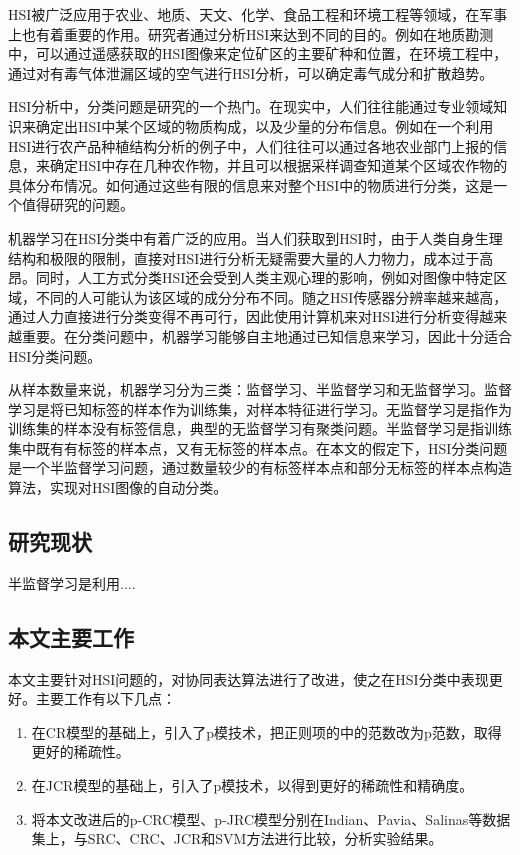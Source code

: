 \documentclass[12pt,a4paper]{article}
\begin{document}
HSI被广泛应用于农业、地质、天文、化学、食品工程和环境工程等领域，在军事上也有着重要的作用。研究者通过分析HSI来达到不同的目的。例如在地质勘测中，可以通过遥感获取的HSI图像来定位矿区的主要矿种和位置，在环境工程中，通过对有毒气体泄漏区域的空气进行HSI分析，可以确定毒气成分和扩散趋势。

HSI分析中，分类问题是研究的一个热门。在现实中，人们往往能通过专业领域知识来确定出HSI中某个区域的物质构成，以及少量的分布信息。例如在一个利用HSI进行农产品种植结构分析的例子中，人们往往可以通过各地农业部门上报的信息，来确定HSI中存在几种农作物，并且可以根据采样调查知道某个区域农作物的具体分布情况。如何通过这些有限的信息来对整个HSI中的物质进行分类，这是一个值得研究的问题。

机器学习在HSI分类中有着广泛的应用。当人们获取到HSI时，由于人类自身生理结构和极限的限制，直接对HSI进行分析无疑需要大量的人力物力，成本过于高昂。同时，人工方式分类HSI还会受到人类主观心理的影响，例如对图像中特定区域，不同的人可能认为该区域的成分分布不同。随之HSI传感器分辨率越来越高，通过人力直接进行分类变得不再可行，因此使用计算机来对HSI进行分析变得越来越重要。在分类问题中，机器学习能够自主地通过已知信息来学习，因此十分适合HSI分类问题。

从样本数量来说，机器学习分为三类：监督学习、半监督学习和无监督学习。监督学习是将已知标签的样本作为训练集，对样本特征进行学习。无监督学习是指作为训练集的样本没有标签信息，典型的无监督学习有聚类问题。半监督学习是指训练集中既有有标签的样本点，又有无标签的样本点。在本文的假定下，HSI分类问题是一个半监督学习问题，通过数量较少的有标签样本点和部分无标签的样本点构造算法，实现对HSI图像的自动分类。

\subsection{研究现状}
半监督学习是利用....

\subsection{本文主要工作}
本文主要针对HSI问题的，对协同表达算法进行了改进，使之在HSI分类中表现更好。主要工作有以下几点：
\begin{enumerate}[(1)]
\item 在CR模型的基础上，引入了p模技术，把正则项的中的范数改为p范数，取得更好的稀疏性。
\item 在JCR模型的基础上，引入了p模技术，以得到更好的稀疏性和精确度。
\item 将本文改进后的p-CRC模型、p-JRC模型分别在Indian、Pavia、Salinas等数据集上，与SRC、CRC、JCR和SVM方法进行比较，分析实验结果。
\end{enumerate}
\end{document}
